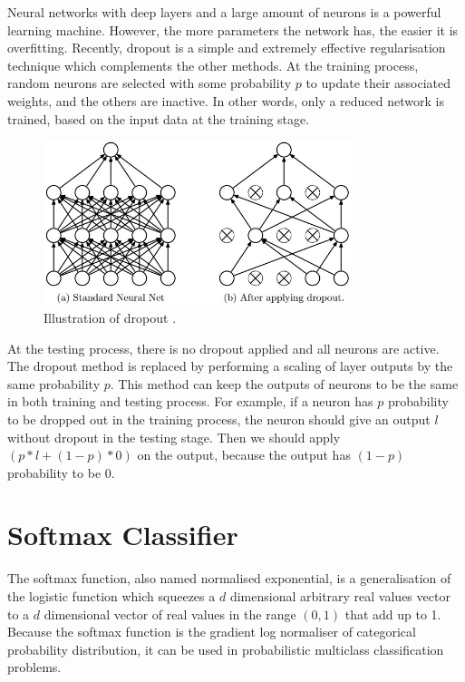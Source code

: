 Neural networks with deep layers and a large amount of neurons is a powerful learning machine. However, the more parameters the network has, the easier it is overfitting. Recently, dropout\citep{srivastava2014dropout} is a simple and extremely effective regularisation technique which complements the other methods. At the training process, random neurons are selected with some probability $p$ to update their associated weights, and the others are inactive. In other words, only a reduced network is trained, based on the input data at the training stage. 
\graphicspath{ {./Figures/} }
\begin{figure}[!htb]
\centering
\includegraphics[width=0.8\textwidth]{dropout.jpeg}
\caption{\label{fig:Dropout}Illustration of dropout \citep{srivastava2014dropout}.}
\end{figure}
At the testing process, there is no dropout applied and all neurons are active. The dropout method is replaced by performing a scaling of layer outputs by the same probability $p$. This method can keep the outputs of neurons to be the same in both training and testing process. For example, if a neuron has $p$ probability to be dropped out in the training process, the neuron should give an output $l$ without dropout in the testing stage. Then we should apply $(p\ast l + (1 - p)\ast 0)$ on the output, because the output has $(1-p)$ probability to be $0$.

\section{Softmax Classifier}

The softmax function, also named normalised exponential, is a generalisation of the logistic function which squeezes a $d$ dimensional arbitrary real values vector to a $d$ dimensional vector of real values in the range $(0,1)$ that add up to 1. Because the softmax function is the gradient log normaliser of categorical probability distribution, it can be used in probabilistic multiclass classification problems.

